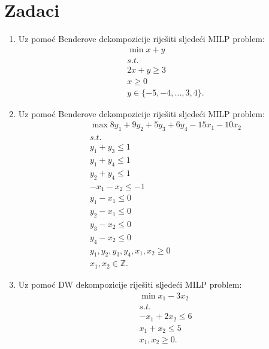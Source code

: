 \documentclass[a4paper, utf8, 11pt, colorlinks]{book}
\theoremstyle{definition}
\begin{document}
\section{Zadaci}
\begin{enumerate}
	\item %
	  	Uz pomoć Benderove dekompozicije riješiti sljedeći MILP problem:
	  \begin{align*}
	  	   &\min x + y \\
	  	   &s.t. \\
	  	   & 2x + y \geq 3 \\
	  	   & x \geq 0 \\
	  	   & y \in \{-5, -4,\ldots, 3, 4\}.
   	  \end{align*}
	\item %
	Uz pomoć Benderove dekompozicije riješiti sljedeći MILP problem:
	\begin{align*}
		 &\max 8 y_1 + 9 y_2 + 5 y_3 + 6 y_4 - 15 x_1 - 10 x_2 \\
		 & s.t.\\
		 &y_1 + y_3 \leq 1 \\
		 & y_1 + y_4 \leq 1 \\
		 &y_2 + y_4 \leq 1 \\
		 & -x_1-x_2 \leq -1 \\
		 & y_1 - x_1 \leq 0 \\
		 & y_2 - x_1 \leq 0 \\
		 & y_3 - x_2 \leq 0 \\
		 & y_4 - x_2 \leq 0 \\
		 & y_1,y_2,y_3,y_4,x_1, x_2 \geq 0 \\
		 & x_1, x_2 \in \mathbb{Z}.
	\end{align*}
\item %
Uz pomoć DW dekompozicije riješiti sljedeći MILP problem:
\begin{align*}
	&\min x_1 - 3 x_2 \\
	& s.t. \\
	& -x_1 + 2x_2 \leq 6 \\
	& x_1 + x_2 \leq 5 \\
	& x_1, x_2 \geq 0.
\end{align*}


\end{enumerate}
\end{document}
